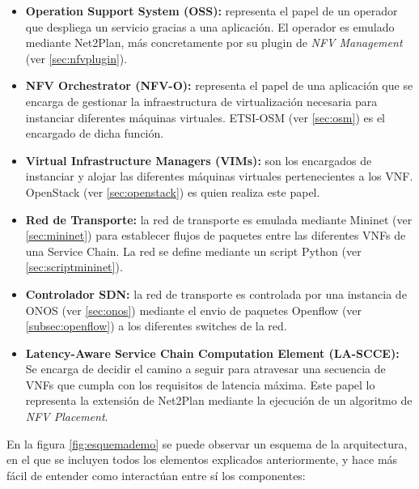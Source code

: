 \begin{itemize}
	\item \textbf{Operation Support System (OSS):} representa el papel de un operador que despliega un servicio gracias a una aplicación. El operador es emulado mediante Net2Plan, más concretamente por su plugin de \textit{NFV Management} (ver \ref{sec:nfvplugin}).
	
	\item \textbf{NFV Orchestrator (NFV-O):} representa el papel de una aplicación que se encarga de gestionar la infraestructura de virtualización necesaria para instanciar diferentes máquinas virtuales. ETSI-OSM (ver \ref{sec:osm}) es el encargado de dicha función.
	
	\item \textbf{Virtual Infrastructure Managers (VIMs):} son los encargados de instanciar y alojar las diferentes máquinas virtuales pertenecientes a los VNF. OpenStack (ver \ref{sec:openstack}) es quien realiza este papel.
	
	\item \textbf{Red de Transporte:} la red de transporte es emulada mediante Mininet (ver \ref{sec:mininet}) para establecer flujos de paquetes entre las diferentes VNFs de una Service Chain. La red se define mediante un script Python (ver \ref{sec:scriptmininet}).
	
	\item \textbf{Controlador SDN:} la red de transporte es controlada por una instancia de ONOS (ver \ref{sec:onos}) mediante el envio de paquetes Openflow (ver \ref{subsec:openflow}) a los diferentes switches de la red.
	
	\item \textbf{Latency-Aware Service Chain Computation Element (LA-SCCE):} Se encarga de decidir el camino a seguir para atravesar una secuencia de VNFs que cumpla con los requisitos de latencia máxima. Este papel lo representa la extensión de Net2Plan mediante la ejecución de un algoritmo de \textit{NFV Placement}. 
\end{itemize}

En la figura \ref{fig:esquemademo} se puede observar un esquema de la arquitectura, en el que se incluyen todos los elementos explicados anteriormente, y hace más fácil de entender como interactúan entre sí los componentes:

